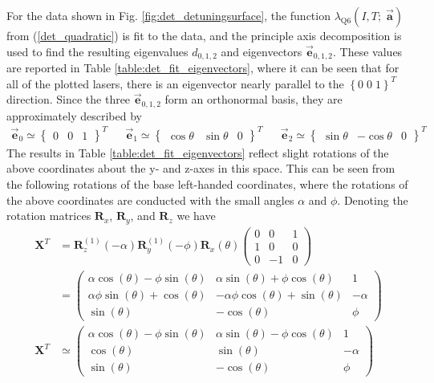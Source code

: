 \documentclass[8pt,a4paper]{report}
\begin{document}
	For the data shown in Fig. \ref{fig:det_detuningsurface}, the function $\lambda_\mathrm{Q6}(I, T;\; \vec{\mathbf{a}})$ from (\ref{det_quadratic}) is fit to the data, and the principle axis decomposition is used to find the resulting eigenvalues $d_{0,1,2}$ and eigenvectors $\vec{\textbf{e}}_{0,1,2}$. These values are reported in Table \ref{table:det_fit_eigenvectors}, where it can be seen that for all of the plotted lasers, there is an eigenvector nearly parallel to the $\left\{0\;0\;1\right\}^T$ direction. Since the three $\vec{\textbf{e}}_{0,1,2}$ form an orthonormal basis, they are approximately described by
	\begin{align}
		\vec{\textbf{e}}_0 \simeq \begin{Bmatrix} 0 & 0 & 1 \end{Bmatrix}^T &&
		\vec{\textbf{e}}_1 \simeq \begin{Bmatrix} \cos\theta & \sin\theta & 0 \end{Bmatrix}^T &&
		\vec{\textbf{e}}_2 \simeq \begin{Bmatrix} \sin\theta & -\cos\theta & 0 \end{Bmatrix}^T &&
	\end{align}
	The results in Table \ref{table:det_fit_eigenvectors} reflect slight rotations of the above coordinates about the y- and z-axes in this space. This can be seen from the following rotations of the base left-handed coordinates, where the rotations of the above coordinates are conducted with the small angles $\alpha$ and $\phi$. Denoting the rotation matrices $\textbf{R}_x$, $\textbf{R}_y$, and $\textbf{R}_z$ we have
	\begin{align} \label{det_eigen_rotation}
		\textbf{X}^T &= \textbf{R}^{(1)}_z(-\alpha) \textbf{R}^{(1)}_y(-\phi) \textbf{R}_x(\theta)
		\begin{pmatrix}
			0 & 0 & 1 \\
			1 & 0 & 0 \\
			0 & -1 & 0
		\end{pmatrix} \nonumber\\
		&=\left(\begin{matrix}\alpha \cos{\left(\theta \right)} - \phi \sin{\left(\theta \right)} & \alpha \sin{\left(\theta \right)} + \phi \cos{\left(\theta \right)} & 1\\\alpha \phi \sin{\left(\theta \right)} + \cos{\left(\theta \right)} & - \alpha \phi \cos{\left(\theta \right)} + \sin{\left(\theta \right)} & - \alpha\\\sin{\left(\theta \right)} & - \cos{\left(\theta \right)} & \phi\end{matrix}\right) \nonumber\\
		\textbf{X}^T & \simeq
		\left(\begin{matrix}\alpha \cos{\left(\theta \right)} - \phi \sin{\left(\theta \right)} & \alpha \sin{\left(\theta \right)} - \phi \cos{\left(\theta \right)} & 1 \\
		\cos{\left(\theta \right)} &  \sin{\left(\theta \right)} & -\alpha\\
		\sin{\left(\theta \right)} & - \cos{\left(\theta \right)} & \phi\end{matrix}\right)
	\end{align}
\end{document}
